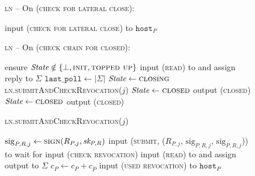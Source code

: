 \begin{figure}[H]
  \begin{processbox}{\textsc{ln} -- On (\textsc{check for lateral close}):}
    \begin{algorithmic}[1]
        \State input (\textsc{check for lateral close}) to
        $\texttt{host}_P$
      \EndIf
    \end{algorithmic}
  \end{processbox}
  \caption{}
  \label{code:ln:poll-virtual}
\end{figure}

\begin{figure}[H]
  \begin{processbox}{\textsc{ln} -- On (\textsc{check chain for closed}):}
    \begin{algorithmic}[1]
      \State ensure $\itistate \notin \{\bot, \textsc{init},
      \textsc{topped up}\}$ 
      \State {}
      \State input (\textsc{read}) to \ledger and assign reply to $\Sigma$
      \State $\texttt{last\_poll} \gets |\Sigma|$
        \State $\itistate \gets \textsc{closing}$
        \State \textsc{ln}.\textsc{submitAndCheckRevocation}($j$)
        \State $\itistate \gets \textsc{closed}$
        \label{code:ln:poll:state-closed-punished}
        \State output (\textsc{closed})
        \State $\itistate \gets \textsc{closed}$
        \label{code:ln:poll:state-closed-honestly}
        \State output (\textsc{closed})
      \EndIf
    \end{algorithmic}
  \end{processbox}
  \caption{}
  \label{code:ln:poll}
\end{figure}

\begin{figure}[H]
  \begin{processbox}{\textsc{ln}.\textsc{submitAndCheckRevocation}($j$)}
    \begin{algorithmic}[1]
      \State $\mathrm{sig}_{P, R, j} \gets \textsc{sign}(R_{P, j}, \textit{sk}_{P, R})$
      \State input (\textsc{submit}, ($R_{P, j}$, $\mathrm{sig}_{P, R, j}$,
      $\mathrm{sig}_{\bar{P}, R, j}$)) to \ledger
        \State wait for input (\textsc{check revocation}) 
        \State input (\textsc{read}) to \ledger and assign output to $\Sigma$
      \EndWhile
      \State $c_P \gets c_P + c_{\bar{P}}$
        \State input (\textsc{used revocation}) to $\texttt{host}_P$
      \EndIf
    \end{algorithmic}
  \end{processbox}
  \caption{}
  \label{code:ln:submit-revocation}
\end{figure}

